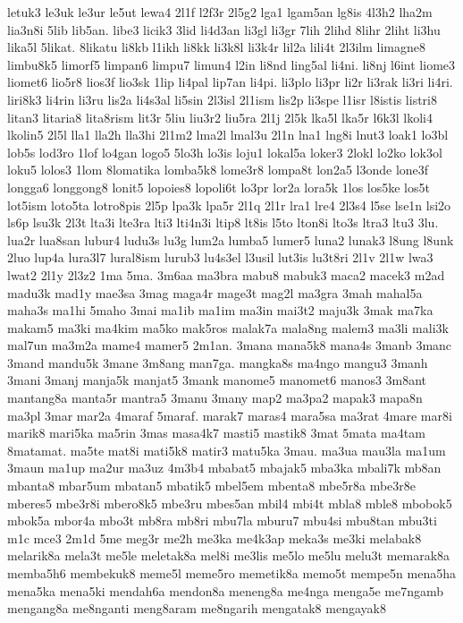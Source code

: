 {letuk3 le3uk le3ur le5ut lewa4 2l1f l2f3r 2l5g2 lga1 lgam5an lg8is 4l3h2
lha2m lia3n8i 5lib lib5an. libe3 licik3 3lid li4d3an li3gl li3gr 7lih
2lihd 8lihr 2liht li3hu lika5l 5likat. 8likatu li8kb l1ikh li8kk li3k8l
li3k4r lil2a lili4t 2l3ilm limagne8 limbu8k5 limorf5 limpan6 limpu7 limun4
l2in li8nd ling5al li4ni. li8nj l6int liome3 liomet6 lio5r8 lios3f lio3sk
1lip li4pal lip7an li4pi. li3plo li3pr li2r li3rak li3ri li4ri. liri8k3
li4rin li3ru lis2a li4s3al li5sin 2l3isl 2l1ism lis2p li3spe l1isr l8istis
listri8 litan3 litaria8 lita8rism lit3r 5liu liu3r2 liu5ra 2l1j 2l5k lka5l
lka5r l6k3l lkoli4 lkolin5 2l5l lla1 lla2h lla3hi 2l1m2 lma2l lmal3u 2l1n
lna1 lng8i lnut3 loak1 lo3bl lob5s lod3ro 1lof lo4gan logo5 5lo3h lo3is
loju1 lokal5a loker3 2lokl lo2ko lok3ol loku5 lolos3 1lom 8lomatika
lomba5k8 lome3r8 lompa8t lon2a5 l3onde lone3f longga6 longgong8 lonit5
lopoies8 lopoli6t lo3pr lor2a lora5k 1los los5ke los5t lot5ism loto5ta
lotro8pis 2l5p lpa3k lpa5r 2l1q 2l1r lra1 lre4 2l3s4 l5se lse1n lsi2o ls6p
lsu3k 2l3t lta3i lte3ra lti3 lti4n3i ltip8 lt8is l5to lton8i lto3s ltra3
ltu3 3lu. lua2r lua8san lubur4 ludu3s lu3g lum2a lumba5 lumer5 luna2
lunak3 l8ung l8unk 2luo lup4a lura3l7 lural8ism lurub3 lu4s3el l3usil
lut3is lu3t8ri 2l1v 2l1w lwa3 lwat2 2l1y 2l3z2 1ma 5ma. 3m6aa ma3bra mabu8
mabuk3 maca2 macek3 m2ad madu3k mad1y mae3sa 3mag maga4r mage3t mag2l
ma3gra 3mah mahal5a maha3s ma1hi 5maho 3mai ma1ib ma1im ma3in mai3t2
maju3k 3mak ma7ka makam5 ma3ki ma4kim ma5ko mak5ros malak7a mala8ng malem3
ma3li mali3k mal7un ma3m2a mame4 mamer5 2m1an. 3mana mana5k8 mana4s 3manb
3manc 3mand mandu5k 3mane 3m8ang man7ga. mangka8s ma4ngo mangu3 3manh
3mani 3manj manja5k manjat5 3mank manome5 manomet6 manos3 3m8ant mantang8a
manta5r mantra5 3manu 3many map2 ma3pa2 mapak3 mapa8n ma3pl 3mar mar2a
4maraf 5maraf. marak7 maras4 mara5sa ma3rat 4mare mar8i marik8 mari5ka
ma5rin 3mas masa4k7 masti5 mastik8 3mat 5mata ma4tam 8matamat. ma5te mat8i
mati5k8 matir3 matu5ka 3mau. ma3ua mau3la ma1um 3maun ma1up ma2ur ma3uz
4m3b4 mbabat5 mbajak5 mba3ka mbali7k mb8an mbanta8 mbar5um mbatan5 mbatik5
mbel5em mbenta8 mbe5r8a mbe3r8e mberes5 mbe3r8i mbero8k5 mbe3ru mbes5an
mbil4 mbi4t mbla8 mble8 mbobok5 mbok5a mbor4a mbo3t mb8ra mb8ri mbu7la
mburu7 mbu4si mbu8tan mbu3ti m1c mce3 2m1d 5me meg3r me2h me3ka me4k3ap
meka3s me3ki melabak8 melarik8a mela3t me5le meletak8a mel8i me3lis me5lo
me5lu melu3t memarak8a memba5h6 membekuk8 meme5l meme5ro memetik8a memo5t
mempe5n mena5ha mena5ka mena5ki mendah6a mendon8a meneng8a me4nga menga5e
me7ngamb mengang8a me8nganti meng8aram me8ngarih mengatak8 mengayak8
}
